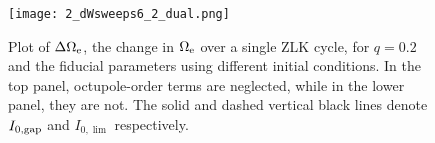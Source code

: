 \documentclass[
        fleqn,
        usenatbib,
    ]{mnras}
\newlength{\colummwidth}
\begin{document}
\begin{figure}
    \centering
    \texttt{[image: 2\_dWsweeps6\_2\_dual.png]}
    \caption{Plot of $\Delta \Omega_{\rm e}$, the change in $\Omega_{\rm e}$
    over a single ZLK cycle, for $q = 0.2$ and the fiducial parameters using
    different initial conditions. In the top panel, octupole-order terms are
    neglected, while in the lower panel, they are not. The solid and dashed
    vertical black lines denote $I_{\rm 0, gap}$ and $I_{0, \lim}$
    respectively.}\label{fig:dW}
\end{figure}

\label{lastpage} %
\end{document}

